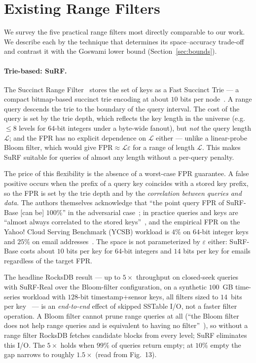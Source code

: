 \section{Existing Range Filters}
\label{sec:existing-work}

We survey the five practical range filters most directly comparable to our work.
We describe each by the technique that determines its
space--accuracy trade-off and contrast it with the Goswami lower
bound (Section~\ref{sec:bounds}).

\paragraph{Trie-based: SuRF.}
The Succinct Range Filter~\citep{zhang2018surf} stores the set of keys
as a Fast Succinct Trie --- a compact bitmap-based succinct trie
encoding at about $10$ bits per node~\citep[\S3.1]{zhang2018surf}.
A range query descends the trie to the boundary of the query interval.
The cost of the query is set by the trie depth, which reflects the
key length in the universe (e.g.\ $\leq 8$ levels for $64$-bit
integers under a byte-wide fanout), but \emph{not} the query length
$\mathcal{L}$; and the FPR has no explicit dependence on $\mathcal{L}$
either --- unlike a linear-probe Bloom filter, which would give
$\mathrm{FPR} \approx \mathcal{L}\varepsilon$ for a range of length $\mathcal{L}$.
This makes SuRF suitable for queries of almost any
length without a per-query penalty.

The price of this flexibility is the absence of a worst-case FPR guarantee.
A false positive occurs when the prefix of a query key
coincides with a stored key prefix, so the FPR is set by the trie
depth and by the \emph{correlation between queries and data}. The
authors themselves acknowledge that ``the point query FPR of
SuRF-Base [can be] $100\%$'' in the adversarial
case~\citep[\S3.2]{zhang2018surf}; in practice queries and keys are
``almost always correlated to the stored
keys''~\citep[\S3.1]{zhang2018surf}, and the empirical FPR on the Yahoo! Cloud Serving Benchmark (YCSB)
workload is $4\%$ on $64$-bit integer keys and $25\%$ on email
addresses~\citep[\S4.2]{zhang2018surf}.
The space is not parameterized by $\varepsilon$ either: SuRF-Base costs about $10$ bits per key for
$64$-bit integers and $14$ bits per key for emails regardless of the
target FPR.

The headline RocksDB result --- up to $5\times$ throughput on
closed-seek queries with SuRF-Real over the Bloom-filter
configuration, on a synthetic $100$~GB time-series workload with
$128$-bit timestamp$+$sensor keys, all filters sized to $14$~bits per
key~\citep[\S6, Fig.~13]{zhang2018surf} --- is an \emph{end-to-end}
effect of skipped SSTable I/O, not a faster filter operation.
A Bloom filter cannot prune range queries at all (``the Bloom filter
does not help range queries and is equivalent to having no
filter''~\citep[\S6]{zhang2018surf}),
so without a range filter RocksDB fetches candidate blocks from every
level; SuRF eliminates this I/O. The $5\times$ holds when $99\%$ of
queries return empty; at $10\%$ empty the gap narrows to roughly
$1.5\times$ (read from Fig.~13).

